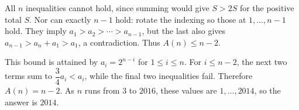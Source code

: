 All $n$ inequalities cannot hold, since summing would give $S>2S$ for the positive total $S$. Nor can exactly $n-1$ hold: rotate the indexing so those at $1,\ldots,n-1$ hold. They imply $a_1>a_2>\cdots>a_{n-1}$, but the last also gives $a_{n-1}>a_n+a_1>a_1$, a contradiction. Thus $A(n)\le n-2$.

This bound is attained by $a_i=2^{n-i}$ for $1\le i\le n$. For $i\le n-2$, the next two terms sum to $\dfrac{3}{4}a_i<a_i$, while the final two inequalities fail. Therefore $A(n)=n-2$. As $n$ runs from $3$ to $2016$, these values are $1,\ldots,2014$, so the answer is $\boxed{2014}$.
